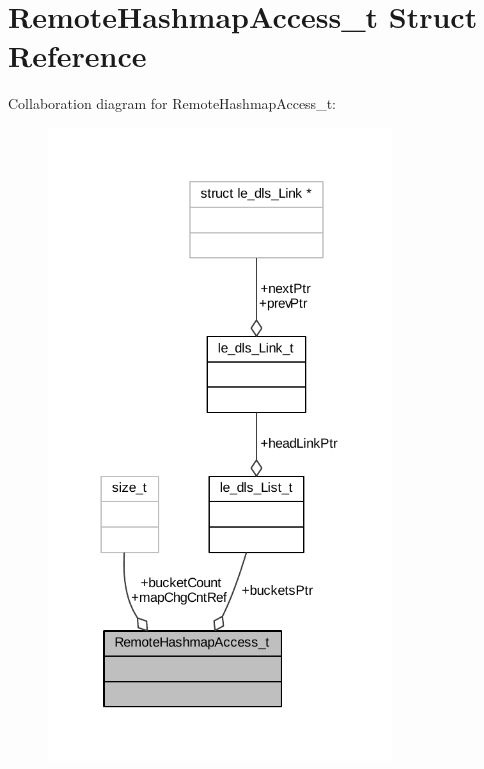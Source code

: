 \hypertarget{struct_remote_hashmap_access__t}{}\section{Remote\+Hashmap\+Access\+\_\+t Struct Reference}
\label{struct_remote_hashmap_access__t}


Collaboration diagram for Remote\+Hashmap\+Access\+\_\+t\+:
\nopagebreak
\begin{figure}[H]
\begin{center}
\leavevmode
\includegraphics[width=258pt]{struct_remote_hashmap_access__t__coll__graph}
\end{center}
\end{figure}
